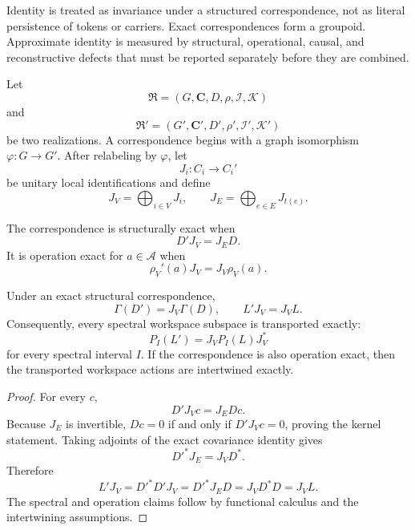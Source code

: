 
Identity is treated as invariance under a structured correspondence, not as
literal persistence of tokens or carriers. Exact correspondences form a
groupoid. Approximate identity is measured by structural, operational,
causal, and reconstructive defects that must be reported separately before
they are combined.


Let
\[
\mathfrak R=(G,\mathbf C,D,\rho,\mathcal I,\mathcal K)
\]
and
\[
\mathfrak R'=(G',\mathbf C',D',\rho',\mathcal I',\mathcal K')
\]
be two realizations. A correspondence begins with a graph isomorphism
\(\varphi:G\to G'\). After relabeling by \(\varphi\), let
\[
J_i:C_i\to C_i'
\]
be unitary local identifications and define
\[
J_V=\bigoplus_{i\in V}J_i,
\qquad
J_E=\bigoplus_{e\in E}J_{t(e)}.
\]

\begin{definition}\label{def:exact-structural-correspondence}
The correspondence is structurally exact when
\[
\boxed{D'J_V=J_ED.}
\]
It is operation exact for \(a\in\mathcal A\) when
\[
\boxed{\rho_V'(a)J_V=J_V\rho_V(a).}
\]
\end{definition}

\begin{theorem}\label{thm:exact-replacement-isomorphism}
Under an exact structural correspondence,
\[
\boxed{
\Gamma(D')=J_V\Gamma(D),
\qquad
L'J_V=J_VL.
}
\]
Consequently, every spectral workspace subspace is transported exactly:
\[
P_I(L')=J_VP_I(L)J_V^*
\]
for every spectral interval \(I\). If the correspondence is also operation
exact, then the transported workspace actions are intertwined exactly.
\end{theorem}

\begin{proof}
For every \(c\),
\[
D'J_Vc=J_EDc.
\]
Because \(J_E\) is invertible, \(Dc=0\) if and only if \(D'J_Vc=0\), proving
the kernel statement. Taking adjoints of the exact covariance identity gives
\[
D'^*J_E=J_VD^*.
\]
Therefore
\[
L'J_V=D'^*D'J_V=D'^*J_ED=J_VD^*D=J_VL.
\]
The spectral and operation claims follow by functional calculus and the
intertwining assumptions.
\end{proof}

